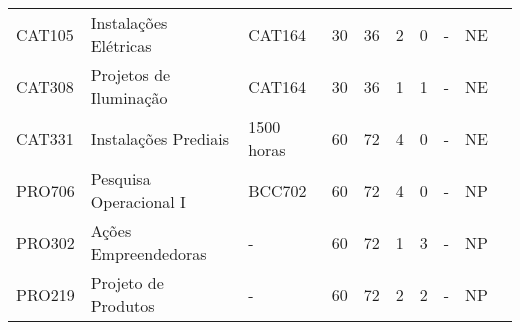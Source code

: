 \begin{table}[tbp]
{\begin{tabular}{llllllllll}
			\multicolumn{1}{|l|}{CAT105}                    & \multicolumn{1}{l|}{Instalações Elétricas}                                                & \multicolumn{1}{l|}{CAT164}                 & \multicolumn{1}{l|}{30}                                                           & \multicolumn{1}{l|}{36}               & \multicolumn{1}{l|}{2}  & \multicolumn{1}{l|}{0}  & \multicolumn{1}{l|}{-}                & \multicolumn{1}{l|}{NE}            &  \\ \cline{1-9}
			\multicolumn{1}{|l|}{CAT308}                    & \multicolumn{1}{l|}{Projetos de Iluminação}                                               & \multicolumn{1}{l|}{CAT164}                 & \multicolumn{1}{l|}{30}                                                           & \multicolumn{1}{l|}{36}               & \multicolumn{1}{l|}{1}  & \multicolumn{1}{l|}{1}  & \multicolumn{1}{l|}{-}                & \multicolumn{1}{l|}{NE}            &  \\ \cline{1-9}
			\multicolumn{1}{|l|}{CAT331}                    & \multicolumn{1}{l|}{Instalações Prediais}                                                 & \multicolumn{1}{l|}{1500 horas}             & \multicolumn{1}{l|}{60}                                                           & \multicolumn{1}{l|}{72}               & \multicolumn{1}{l|}{4}  & \multicolumn{1}{l|}{0}  & \multicolumn{1}{l|}{-}                & \multicolumn{1}{l|}{NE}            &  \\ \cline{1-9}
			\multicolumn{1}{|l|}{PRO706}                    & \multicolumn{1}{l|}{Pesquisa Operacional I}                                               & \multicolumn{1}{l|}{BCC702}                 & \multicolumn{1}{l|}{60}                                                           & \multicolumn{1}{l|}{72}               & \multicolumn{1}{l|}{4}  & \multicolumn{1}{l|}{0}  & \multicolumn{1}{l|}{-}                & \multicolumn{1}{l|}{NP}            &  \\ \cline{1-9}
			\multicolumn{1}{|l|}{PRO302}                    & \multicolumn{1}{l|}{Ações Empreendedoras}                                                 & \multicolumn{1}{l|}{-}                      & \multicolumn{1}{l|}{60}                                                           & \multicolumn{1}{l|}{72}               & \multicolumn{1}{l|}{1}  & \multicolumn{1}{l|}{3}  & \multicolumn{1}{l|}{-}                & \multicolumn{1}{l|}{NP}            &  \\ \cline{1-9}
			\multicolumn{1}{|l|}{PRO219}                    & \multicolumn{1}{l|}{Projeto de Produtos}                                                  & \multicolumn{1}{l|}{-}                      & \multicolumn{1}{l|}{60}                                                           & \multicolumn{1}{l|}{72}               & \multicolumn{1}{l|}{2}  & \multicolumn{1}{l|}{2}  & \multicolumn{1}{l|}{-}                & \multicolumn{1}{l|}{NP}            &  \\ \cline{1-9}

\end{tabular}}
\end{table}
